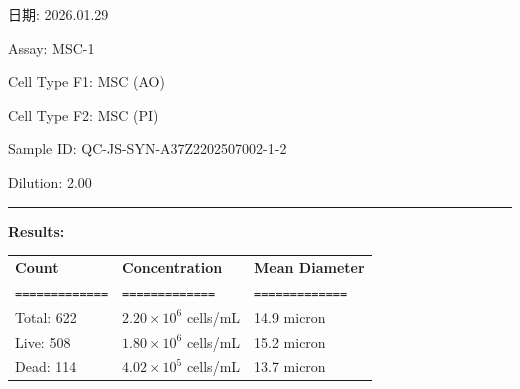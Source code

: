 \documentclass[UTF8,10pt,a4paper,fontset=fandol]{ctexart}
\renewcommand{\arraystretch}{1.15}
\newcommand{\fieldvalue}[1]{#1}
\newcommand{\handwritten}[1]{#1}
\begin{document}
\begin{center}
\begin{center}
\hfill

日期: %
\fieldvalue{\handwritten{2026.01.29}}

\newpage

\noindent
Assay:
\fieldvalue{MSC-1}

\medskip
\noindent
Cell Type F1:
\fieldvalue{MSC (AO)}

\noindent
Cell Type F2:
\fieldvalue{MSC (PI)}

\medskip
\noindent
Sample ID:
\fieldvalue{QC-JS-SYN-A37Z2202507002-1-2}

\noindent
Dilution:
\fieldvalue{2.00}

\bigskip
\noindent\rule{\textwidth}{0.4pt}

\noindent\textbf{Results:}

\medskip
\renewcommand{\arraystretch}{1.2}
\begin{tabularx}{\textwidth}{@{}X X X@{}}
\textbf{Count} & \textbf{Concentration} & \textbf{Mean Diameter} \\
\texttt{=============} & \texttt{=============} & \texttt{=============} \\

Total:
\fieldvalue{622}
&
\fieldvalue{$2.20\times10^{6}$ cells/mL}
&
\fieldvalue{14.9 micron}
\\

Live:
\fieldvalue{508}
&
\fieldvalue{$1.80\times10^{6}$ cells/mL}
&
\fieldvalue{15.2 micron}
\\

Dead:
\fieldvalue{114}
&
\fieldvalue{$4.02\times10^{5}$ cells/mL}
&
\fieldvalue{13.7 micron}
\\


\end{tabularx}
\end{center}
\end{center}
\end{document}
